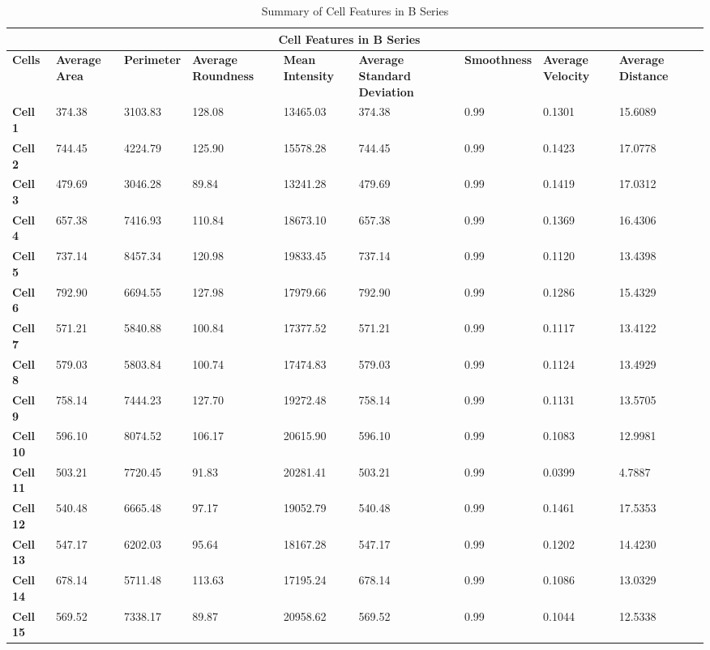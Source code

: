 \documentclass{article}
\begin{document}
\begin{table}[h!]
\centering
\caption{Summary of Cell Features in B Series}\label{table:SummaryCellFeatures-SeriesB}
\begin{tabular}{ |p{1.2cm}|p{1.5cm}|p{1.5cm}|p{1.7cm}|p{1.7cm}|p{1.7cm}|p{1.7cm}|p{1.7cm}|p{1.7cm}|p{1.7cm}| }
\hline
\multicolumn{9}{|c|}{\textbf{Cell Features in B Series}} \\
\hline
\textbf{Cells} & \textbf{Average Area} & \textbf{Perimeter} & \textbf{Average Roundness} & \textbf{Mean Intensity} & \textbf{Average Standard Deviation} & \textbf{Smoothness} & \textbf{Average Velocity} & \textbf{Average Distance} \\
\hline
\textbf{Cell 1} & 374.38 & 3103.83 & 128.08 & 13465.03 & 374.38 & 0.99 & 0.1301 & 15.6089\\
\textbf{Cell 2} & 744.45 & 4224.79 & 125.90 & 15578.28 & 744.45 & 0.99 & 0.1423 & 17.0778 \\
\textbf{Cell 3} & 479.69 & 3046.28 & 89.84 & 13241.28 & 479.69 & 0.99 & 0.1419 & 17.0312 \\
\textbf{Cell 4} & 657.38 & 7416.93 & 110.84 & 18673.10 & 657.38 & 0.99 & 0.1369 & 16.4306 \\
\textbf{Cell 5} & 737.14 & 8457.34 & 120.98 & 19833.45 & 737.14 & 0.99 & 0.1120 & 13.4398\\
\textbf{Cell 6} & 792.90 & 6694.55 & 127.98 & 17979.66 & 792.90 & 0.99 & 0.1286 & 15.4329\\
\textbf{Cell 7} & 571.21 & 5840.88 & 100.84 & 17377.52 & 571.21 & 0.99 & 0.1117 & 13.4122\\
\textbf{Cell 8} & 579.03 & 5803.84 & 100.74 & 17474.83 & 579.03 & 0.99 & 0.1124 & 13.4929\\
\textbf{Cell 9} & 758.14 & 7444.23 & 127.70 & 19272.48 & 758.14 & 0.99 & 0.1131 & 13.5705\\
\textbf{Cell 10} & 596.10 & 8074.52 & 106.17 & 20615.90 & 596.10 & 0.99 & 0.1083 & 12.9981\\
\textbf{Cell 11} & 503.21 & 7720.45 & 91.83 & 20281.41 & 503.21 & 0.99 & 0.0399 & 4.7887\\
\textbf{Cell 12} & 540.48 & 6665.48 & 97.17 & 19052.79 & 540.48 & 0.99 & 0.1461 & 17.5353\\
\textbf{Cell 13} & 547.17 & 6202.03 & 95.64 & 18167.28 & 547.17 & 0.99 & 0.1202 & 14.4230\\
\textbf{Cell 14} & 678.14 & 5711.48 & 113.63 & 17195.24 & 678.14 & 0.99 & 0.1086 &  13.0329\\
\textbf{Cell 15} & 569.52 & 7338.17 & 89.87 & 20958.62 & 569.52 & 0.99 & 0.1044 & 12.5338\\
\hline
\end{tabular}
\end{table}
\end{document}
